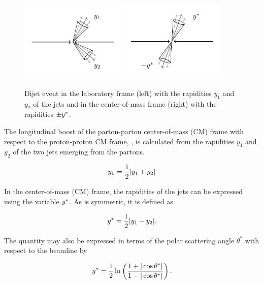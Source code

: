 \begin{figure}[htbp]
    \centering
    \includegraphics[width=0.45\textwidth]{figures/drawings/dijet_lab.pdf}
    \includegraphics[width=0.45\textwidth]{figures/drawings/dijet_cm.pdf}
    \caption[Dijet event in laboratory and center-of-mass frame.]
        {Dijet event in the laboratory frame (left) with the rapidities $y_1$
        and $y_2$ of the jets and in the center-of-mass frame (right) with the
    rapidities $\pm y^*$.}
    \label{fig:dijet_cm_lab_frame}
\end{figure}

The longitudinal boost of the parton-parton center-of-mass (CM) frame with
respect to the proton-proton CM frame, \yboost, is calculated from the
rapidities $y_1$ and $y_2$ of the two jets emerging from the partons. 

\begin{equation*}
    y_{\mathrm{b}} = \frac{1}{2} |y_1 + y_2|
\end{equation*}

In the center-of-mass (CM) frame, the rapidities of the jets can be expressed
using the variable $y^*$. As \ystar is symmetric, it is defined as

\begin{equation*}
    y^* = \frac{1}{2} |y_1 - y_2|.
\end{equation*}

The quantity \ystar may also be expressed in terms of the polar scattering angle
$\theta^*$ with respect to the beamline by 

\begin{equation*}
    y^* = \frac{1}{2} \ln \left( \frac{1 + |\cos \theta^*|}{1- | \cos \theta^*|} \right).
\end{equation*}

